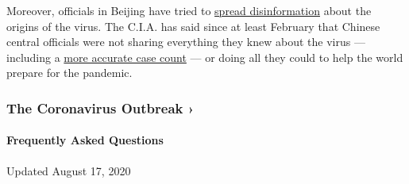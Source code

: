 Moreover, officials in Beijing have tried to
\href{https://www.nytimes3xbfgragh.onion/2020/03/13/world/asia/coronavirus-china-conspiracy-theory.html}{spread
disinformation} about the origins of the virus. The C.I.A. has said
since at least February that Chinese central officials were not sharing
everything they knew about the virus --- including a
\href{https://www.nytimes3xbfgragh.onion/2020/04/02/us/politics/cia-coronavirus-china.html}{more
accurate case count} --- or doing all they could to help the world
prepare for the pandemic.

\href{https://www.nytimes3xbfgragh.onion/news-event/coronavirus?action=click\&pgtype=Article\&state=default\&region=MAIN_CONTENT_3\&context=storylines_faq}{}

\hypertarget{the-coronavirus-outbreak-}{%
\subsubsection{The Coronavirus Outbreak
›}\label{the-coronavirus-outbreak-}}

\hypertarget{frequently-asked-questions}{%
\paragraph{Frequently Asked
Questions}\label{frequently-asked-questions}}

Updated August 17, 2020

